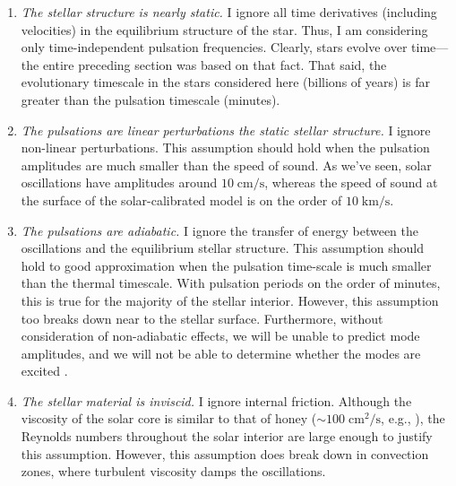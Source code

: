 \begin{enumerate} 
    \item \emph{The stellar structure is nearly static.} 
    I ignore all time derivatives (including velocities) in the equilibrium structure of the star. 
    Thus, I am considering only time-independent pulsation frequencies. 
    Clearly, stars evolve over time---the entire preceding section was based on that fact. 
    That said, the evolutionary timescale in the stars considered here (billions of years) is far greater than the pulsation timescale (minutes). 
    
    \item \emph{The pulsations are linear perturbations the static stellar structure.} 
    I ignore non-linear perturbations. %
    This assumption should hold when the pulsation amplitudes are much smaller than the speed of sound. 
    As we've seen, solar oscillations have amplitudes around ${10\;\text{cm/s}}$, whereas the speed of sound at the surface of the solar-calibrated model is on the order of ${10\;\text{km/s}}$. 
    
    \item \emph{The pulsations are adiabatic.} 
    I ignore the transfer of energy between the oscillations and the equilibrium stellar structure. 
    This assumption should hold to good approximation when the pulsation time-scale is much smaller than the thermal timescale. 
    With pulsation periods on the order of minutes, this is true for the majority of the stellar interior.
    However, this assumption too breaks down near to the stellar surface. 
    Furthermore, without consideration of non-adiabatic effects, we will be unable to predict mode amplitudes, and we will not be able to determine whether the modes are excited \citep[e.g.,][]{2015EAS....73..111S}. 
    
    \item \emph{The stellar material is inviscid.} 
    I ignore internal friction. 
    Although the viscosity of the solar core is similar to that of honey (${\sim 100\;\text{cm}^2/\text{s}}$, e.g., \citealt{fox2000geophysical}), the Reynolds numbers throughout the solar interior are large enough to justify this assumption. %
    However, this assumption does break down in convection zones, where turbulent viscosity damps the oscillations. 
\end{enumerate} 
